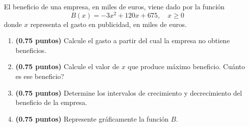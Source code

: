 
El beneficio de una empresa, en miles de euros, viene dado por la función
\[
B(x)=-3x^2+120x+675,\quad x\geq0
\]
donde $x$ representa el gasto en publicidad, en miles de euros.
\begin{enumerate}[label=\alph*)]
\item \textbf{(0.75 puntos)} Calcule el gasto a partir del cual la empresa no obtiene beneficios.
\item \textbf{(0.75 puntos)} Calcule el valor de $x$ que produce máximo beneficio. \textquestiondown{}Cuánto es ese beneficio?
\item \textbf{(0.75 puntos)} Determine los intervalos de crecimiento y decrecimiento del beneficio de la empresa.
\item \textbf{(0.75 puntos)} Represente gráficamente la función $B$.
\end{enumerate}
